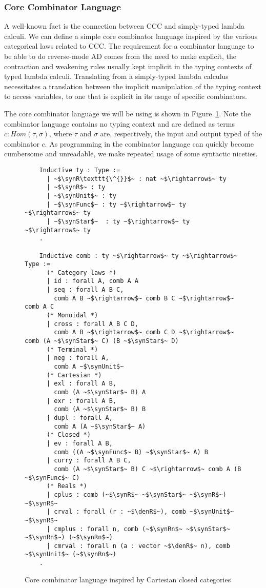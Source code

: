 \subsubsection{Core Combinator Language}\label{sec:combinator-core}
  A well-known fact is the connection between CCC and simply-typed lambda calculi\cite{10.1007/3-540-15198-2_10}.
  We can define a simple core combinator language inspired by the various categorical laws related to CCC.
  The requirement for a combinator language to be able to do reverse-mode AD comes from the need to make explicit, the contraction and weakening rules usually kept implicit in the typing contexts of typed lambda calculi.
  Translating from a simply-typed lambda calculus necessitates a translation between the implicit manipulation of the typing context to access variables, to one that is explicit in its usage of specific combinators.

  The core combinator language we will be using is shown in Figure~\ref{fig:combinator_core_lang}.
  Note the combinator language contains no typing context and are defined as terms $c : Hom(\tau, \sigma)$, where $\tau$ and $\sigma$ are, respectively, the input and output typed of the combinator $c$.
  As programming in the combinator language can quickly become cumbersome and unreadable, we make repeated usage of some syntactic niceties.

  \begin{figure}[]
    \centering
    \begin{verbatim}
    Inductive ty : Type :=
      | ~$\synR\texttt{\^{}}$~ : nat ~$\rightarrow$~ ty
      | ~$\synR$~ : ty
      | ~$\synUnit$~ : ty
      | ~$\synFunc$~ : ty ~$\rightarrow$~ ty ~$\rightarrow$~ ty
      | ~$\synStar$~  : ty ~$\rightarrow$~ ty ~$\rightarrow$~ ty
    .

    Inductive comb : ty ~$\rightarrow$~ ty ~$\rightarrow$~ Type :=
      (* Category laws *)
      | id : forall A, comb A A
      | seq : forall A B C,
        comb A B ~$\rightarrow$~ comb B C ~$\rightarrow$~ comb A C
      (* Monoidal *)
      | cross : forall A B C D,
        comb A B ~$\rightarrow$~ comb C D ~$\rightarrow$~ comb (A ~$\synStar$~ C) (B ~$\synStar$~ D)
      (* Terminal *)
      | neg : forall A,
        comb A ~$\synUnit$~
      (* Cartesian *)
      | exl : forall A B,
        comb (A ~$\synStar$~ B) A
      | exr : forall A B,
        comb (A ~$\synStar$~ B) B
      | dupl : forall A,
        comb A (A ~$\synStar$~ A)
      (* Closed *)
      | ev : forall A B,
        comb ((A ~$\synFunc$~ B) ~$\synStar$~ A) B
      | curry : forall A B C,
        comb (A ~$\synStar$~ B) C ~$\rightarrow$~ comb A (B ~$\synFunc$~ C)
      (* Reals *)
      | cplus : comb (~$\synR$~ ~$\synStar$~ ~$\synR$~) ~$\synR$~
      | crval : forall (r : ~$\denR$~), comb ~$\synUnit$~ ~$\synR$~
      | cmplus : forall n, comb (~$\synRn$~ ~$\synStar$~ ~$\synRn$~) (~$\synRn$~)
      | cmrval : forall n (a : vector ~$\denR$~ n), comb ~$\synUnit$~ (~$\synRn$~)
    .
    \end{verbatim}
    \caption{Core combinator language inspired by Cartesian closed categories}
    \label{fig:combinator_core_lang}
  \end{figure}

